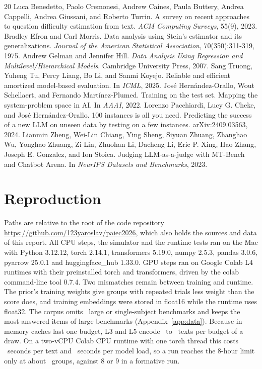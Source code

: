 \documentclass{article}
\begin{document}
\begin{thebibliography}{20}
 Luca Benedetto, Paolo Cremonesi, Andrew Caines, Paula Buttery, Andrea Cappelli, Andrea Giussani, and Roberto Turrin. A survey on recent approaches to question difficulty estimation from text. \emph{ACM Computing Surveys}, 55(9), 2023.
 Bradley Efron and Carl Morris. Data analysis using Stein's estimator and its generalizations. \emph{Journal of the American Statistical Association}, 70(350):311-319, 1975.
 Andrew Gelman and Jennifer Hill. \emph{Data Analysis Using Regression and Multilevel/Hierarchical Models}. Cambridge University Press, 2007.
 Sang Truong, Yuheng Tu, Percy Liang, Bo Li, and Sanmi Koyejo. Reliable and efficient amortized model-based evaluation. In \emph{ICML}, 2025.
 Jos{\'e} Hern{\'a}ndez-Orallo, Wout Schellaert, and Fernando Mart{\'i}nez-Plumed. Training on the test set. Mapping the system-problem space in AI. In \emph{AAAI}, 2022.
 Lorenzo Pacchiardi, Lucy G. Cheke, and Jos{\'e} Hern{\'a}ndez-Orallo. 100 instances is all you need. Predicting the success of a new LLM on unseen data by testing on a few instances. arXiv:2409.03563, 2024.
 Lianmin Zheng, Wei-Lin Chiang, Ying Sheng, Siyuan Zhuang, Zhanghao Wu, Yonghao Zhuang, Zi Lin, Zhuohan Li, Dacheng Li, Eric P. Xing, Hao Zhang, Joseph E. Gonzalez, and Ion Stoica. Judging LLM-as-a-judge with MT-Bench and Chatbot Arena. In \emph{NeurIPS Datasets and Benchmarks}, 2023.
\end{thebibliography}
\endgroup

\appendix
\section{Reproduction}
\label{app:repro}
Paths are relative to the root of the code repository \url{https://github.com/123yaroslav/paiec2026}, which also holds the sources and data of this report. All CPU steps, the simulator and the runtime tests ran on the Mac with Python 3.12.12, torch 2.14.1, transformers 5.19.0, numpy 2.5.3, pandas 3.0.6, pyarrow 25.0.1 and huggingface\_hub 1.33.0. GPU steps ran on Google Colab L4 runtimes with their preinstalled torch and transformers, driven by the colab command-line tool 0.7.4. Two mismatches remain between training and runtime. The prior's training weights give groups with repeated trials less weight than the score does, and training embeddings were stored in float16 while the runtime uses float32. The corpus omits \NBenchNotFetched\ large or single-subject benchmarks and keeps the most-answered items of large benchmarks (Appendix~\ref{app:data}). Because in-memory caches last one budget, L3 and L5 encode \EncPerBudgetLo\ to \EncPerBudgetHi\ texts per budget of a draw. On a two-vCPU Colab CPU runtime with one torch thread this costs \EncTextSec\ seconds per text and \EncLoadSec\ seconds per model load, so a run reaches the 8-hour limit only at about \EncMaxGroups\ groups, against 8 or 9 in a formative run.
\end{document}
